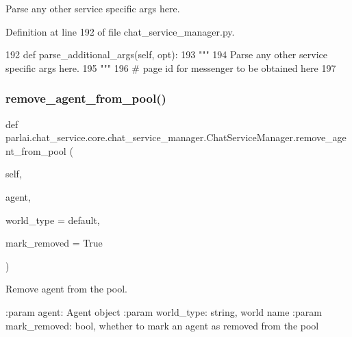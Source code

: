 \begin{DoxyVerb}Parse any other service specific args here.
\end{DoxyVerb}
 

Definition at line 192 of file chat\+\_\+service\+\_\+manager.\+py.


\begin{DoxyCode}
192     \textcolor{keyword}{def }parse\_additional\_args(self, opt):
193         \textcolor{stringliteral}{"""}
194 \textcolor{stringliteral}{        Parse any other service specific args here.}
195 \textcolor{stringliteral}{        """}
196         \textcolor{comment}{# page id for messenger to be obtained here}
197 
\end{DoxyCode}
\mbox{\label{classparlai_1_1chat__service_1_1core_1_1chat__service__manager_1_1ChatServiceManager_a926a7c35369cb78cc81839cf2c7c1321}} 
\subsubsection{\texorpdfstring{remove\+\_\+agent\+\_\+from\+\_\+pool()}{remove\_agent\_from\_pool()}}
{\footnotesize\ttfamily def parlai.\+chat\+\_\+service.\+core.\+chat\+\_\+service\+\_\+manager.\+Chat\+Service\+Manager.\+remove\+\_\+agent\+\_\+from\+\_\+pool (\begin{DoxyParamCaption}\item[{}]{self,  }\item[{}]{agent,  }\item[{}]{world\+\_\+type = {\ttfamily \textquotesingle{}default\textquotesingle{}},  }\item[{}]{mark\+\_\+removed = {\ttfamily True} }\end{DoxyParamCaption})}

\begin{DoxyVerb}Remove agent from the pool.

:param agent:
    Agent object
:param world_type:
    string, world name
:param mark_removed:
    bool, whether to mark an agent as removed from the pool
\end{DoxyVerb}
 

